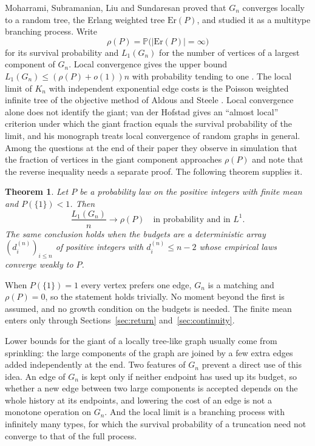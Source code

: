 \documentclass[11pt]{amsart}
\newtheorem{theorem}{Theorem}[section]
\theoremstyle{remark}
\numberwithin{equation}{section}
\newcommand{\Pp}{\mathbb P}
\newcommand{\1}{\mathbf 1}
\newcommand{\Er}{\mathrm{Er}}
\begin{document}
Moharrami, Subramanian, Liu and Sundaresan \cite{EWT} proved that $G_n$ converges locally to a random tree, the Erlang weighted tree $\Er(P)$, and studied it as a multitype branching process. Write
\[
\rho(P)=\Pp\bigl(|\Er(P)|=\infty\bigr)
\]
for its survival probability and $L_1(G_n)$ for the number of vertices of a largest component of $G_n$. Local convergence gives the upper bound $L_1(G_n)\le(\rho(P)+o(1))n$ with probability tending to one \cite[Corollary~2.2]{EWT}. The local limit of $K_n$ with independent exponential edge costs is the Poisson weighted infinite tree of the objective method of Aldous and Steele \cite{AS}. Local convergence alone does not identify the giant; van der Hofstad \cite{vdH} gives an ``almost local'' criterion under which the giant fraction equals the survival probability of the limit, and his monograph \cite{vdHbook} treats local convergence of random graphs in general. Among the questions at the end of their paper \cite[Section~4, question~3]{EWT} they observe in simulation that the fraction of vertices in the giant component approaches $\rho(P)$ and note that the reverse inequality needs a separate proof. The following theorem supplies it.

\begin{theorem}\label{thm:main}
Let $P$ be a probability law on the positive integers with finite mean and $P(\{1\})<1$. Then
\[
\frac{L_1(G_n)}{n}\to\rho(P)\quad\text{in probability and in }L^1 .
\]
The same conclusion holds when the budgets are a deterministic array $(d_i^{(n)})_{i\le n}$ of positive integers with $d_i^{(n)}\le n-2$ whose empirical laws converge weakly to $P$.
\end{theorem}

When $P(\{1\})=1$ every vertex prefers one edge, $G_n$ is a matching and $\rho(P)=0$, so the statement holds trivially. No moment beyond the first is assumed, and no growth condition on the budgets is needed. The finite mean enters only through Sections~\ref{sec:return} and~\ref{sec:continuity}.

Lower bounds for the giant of a locally tree-like graph usually come from sprinkling: the large components of the graph are joined by a few extra edges added independently at the end. Two features of $G_n$ prevent a direct use of this idea. An edge of $G_n$ is kept only if neither endpoint has used up its budget, so whether a new edge between two large components is accepted depends on the whole history at its endpoints, and lowering the cost of an edge is not a monotone operation on $G_n$. And the local limit is a branching process with infinitely many types, for which the survival probability of a truncation need not converge to that of the full process.
\end{document}
